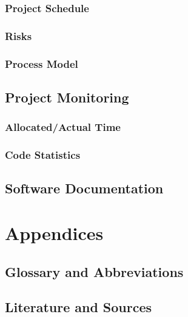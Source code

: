 \documentclass[a4paper,parskip=full]{scrreprt}
\begin{document}
\section{Project Schedule}
\section{Risks}
\section{Process Model}

\chapter{Project Monitoring}
\section{Allocated/Actual Time}
\section{Code Statistics}

\chapter{Software Documentation}


\part{Appendices}

\chapter{Glossary and Abbreviations}

\chapter{Literature and Sources}
\end{document}
